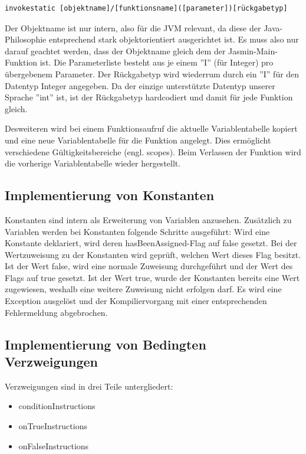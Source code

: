 \begin{lstlisting}[frame=single]
invokestatic [objektname]/[funktionsname]([parameter])[rückgabetyp]
\end{lstlisting}
Der Objektname ist nur intern, also für die JVM relevant, da diese der Java-Philosophie entsprechend stark objektorientiert ausgerichtet ist. Es muss also nur darauf geachtet werden, dass der Objektname gleich dem der Jasmin-Main-Funktion ist.
Die Parameterliste besteht aus je einem ''I'' (für Integer) pro übergebenem Parameter.
Der Rückgabetyp wird wiederrum durch ein ''I'' für den Datentyp Integer angegeben. Da der einzige unterstützte Datentyp unserer Sprache ''int'' ist, ist der Rückgabetyp hardcodiert und damit für jede Funktion gleich.

Desweiteren wird bei einem Funktionsaufruf die aktuelle Variablentabelle kopiert und eine neue Variablentabelle für die Funktion angelegt. Dies ermöglicht verschiedene Gültigkeitsbereiche (engl. scopes). 
Beim Verlassen der Funktion wird die vorherige Variablentabelle wieder hergestellt.

\subsection{Implementierung von Konstanten}
Konstanten sind intern als Erweiterung von Variablen anzusehen. 
Zusätzlich zu Variablen werden bei Konstanten folgende Schritte ausgeführt:
Wird eine Konstante deklariert, wird deren hasBeenAssigned-Flag auf false gesetzt.
Bei der Wertzuweisung zu der Konstanten wird geprüft, welchen Wert dieses Flag besitzt. Ist der Wert false, wird eine normale Zuweisung durchgeführt und der Wert des Flags auf true gesetzt. Ist der Wert true, wurde der Konstanten bereits eine Wert zugewiesen, weshalb eine weitere Zuweisung nicht erfolgen darf. Es wird eine Exception ausgelöst und der Kompiliervorgang mit einer entsprechenden Fehlermeldung abgebrochen.

\subsection{Implementierung von Bedingten Verzweigungen}
Verzweigungen sind in drei Teile untergliedert:
\begin{itemize}
	\item conditionInstructions
	\item onTrueInstructions
	\item onFalseInstructions	
\end{itemize}

